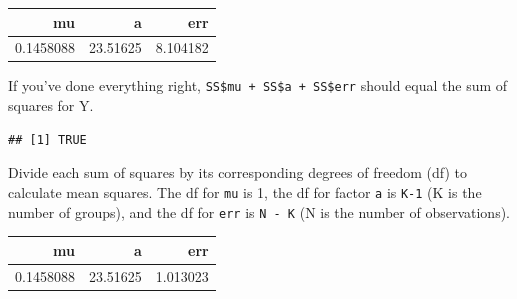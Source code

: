 \documentclass[
  oneside]{book}
\newenvironment{Shaded}{\begin{snugshade}}{\end{snugshade}}
\newcommand{\AttributeTok}[1]{\textcolor[rgb]{0.77,0.63,0.00}{#1}}
\newcommand{\DecValTok}[1]{\textcolor[rgb]{0.00,0.00,0.81}{#1}}
\newcommand{\FunctionTok}[1]{\textcolor[rgb]{0.00,0.00,0.00}{#1}}
\newcommand{\NormalTok}[1]{#1}
\newcommand{\OtherTok}[1]{\textcolor[rgb]{0.56,0.35,0.01}{#1}}
\newcommand{\SpecialCharTok}[1]{\textcolor[rgb]{0.00,0.00,0.00}{#1}}
\begin{document}
\begin{tabular}{r|r|r}
\hline
mu & a & err\\
\hline
0.1458088 & 23.51625 & 8.104182\\
\hline
\end{tabular}

If you've done everything right, \texttt{SS\$mu\ +\ SS\$a\ +\ SS\$err} should equal the sum of squares for Y.

\begin{Shaded}
\end{Shaded}

\begin{verbatim}
## [1] TRUE
\end{verbatim}

Divide each sum of squares by its corresponding degrees of freedom (df) to calculate mean squares. The df for \texttt{mu} is 1, the df for factor \texttt{a} is \texttt{K-1} (K is the number of groups), and the df for \texttt{err} is \texttt{N\ -\ K} (N is the number of observations).

\begin{Shaded}
\end{Shaded}

\begin{tabular}{r|r|r}
\hline
mu & a & err\\
\hline
0.1458088 & 23.51625 & 1.013023\\
\hline
\end{tabular}
\end{document}
